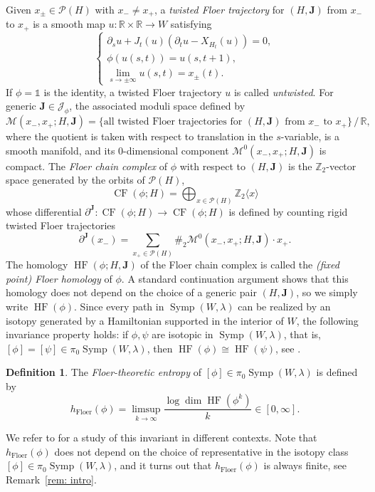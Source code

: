 \documentclass[12pt]{article}
\theoremstyle{theorem}
\theoremstyle{definition}
\newtheorem{definition}[theorem]{Definition}
\theoremstyle{remark}
\numberwithin{equation}{section}
\newcommand{\p}{\partial}
\newcommand{\R}{{\mathbb{R}}}
\newcommand{\Z}{{\mathbb{Z}}}
\DeclareMathOperator{\floer}{Floer}
\DeclareMathOperator{\Symp}{Symp}
\DeclareMathOperator{\HF}{HF}
\DeclareMathOperator{\CF}{CF}
\begin{document}
Given $x_\pm \in \mathcal{P}(H)$ with $x_-\ne x_+$,
a \emph{twisted Floer trajectory} for $(H,{\bm J})$ from $x_-$ to $x_+$ is a smooth map $u\colon \R\times \R \to W$ satisfying
$$
\begin{cases}
\p_s u + J_t(u)(\p_t u - X_{H_t}(u))=0, \\
\phi(u(s,t))=u(s,t+1), \\
\displaystyle \lim_{s\to \pm \infty}u(s,t)=x_\pm(t).
\end{cases}
$$
If $\phi=\mathds{1}$ is the identity, a twisted Floer trajectory $u$ is called \emph{untwisted}.
For generic ${\bm J}\in \mathcal{J}_\phi$, the associated moduli space defined by
$$
\mathcal{M}(x_-,x_+;H,{\bm J})=\big\{ \text{all twisted Floer trajectories for $(H,{\bm J})$ from $x_-$ to $x_+$}\big\}\, \big/\, \R,
$$
where the quotient is taken with respect to translation in the $s$-variable, is a smooth manifold, and its 0-dimensional component $\mathcal{M}^0(x_-,x_+;H,{\bm J})$ is compact.
The \emph{Floer chain complex} of $\phi$ with respect to $(H,{\bm J})$ is the $\Z_2$-vector space generated by the orbits of $\mathcal{P}(H)$,
$$
\CF(\phi;H)=\bigoplus_{x\in \mathcal{P}(H)}\Z_2\langle x \rangle
$$
whose differential $\p^{\bm J}\colon \CF(\phi;H)\to \CF(\phi;H)$ is defined by counting rigid twisted Floer trajectories
$$
\p^{\bm J}(x_-)=\sum_{x_+\in \mathcal{P}(H)} \#_2\mathcal{M}^0(x_-,x_+;H,{\bm J})\cdot x_+.
$$
The homology $\HF(\phi;H,{\bm J})$ of the Floer chain complex is called the \emph{(fixed point) Floer homology} of $\phi$.
A standard continuation argument shows that this homology does not depend on the choice of a  generic pair $(H,{\bm J})$, so we simply write $\HF(\phi)$.
Since every path in $\Symp(W,\lambda)$ can be realized by an isotopy generated by a Hamiltonian supported in the interior of $W$, the following invariance property holds: if $\phi,\psi$ are isotopic in $\Symp(W,\lambda)$, that is, $[\phi]=[\psi]\in\pi_0\Symp(W,\lambda)$, then $\HF(\phi)\cong \HF(\psi)$, see \cite[Theorem~2.34]{Ul17}.
\begin{definition}\label{def: floer_entropy}
	The \emph{Floer-theoretic entropy} of $[\phi]\in \pi_0\Symp(W,\lambda)$ is defined by
	$$
	h_{\floer}(\phi)=\limsup_{k\to \infty}\frac{\log \dim \HF(\phi^k)}{k}\in [0,\infty].
	$$
\end{definition}
We refer to \cite{Sm12, Fe12} for a study of this invariant in different contexts.
Note that $h_{\floer}(\phi)$ does not depend on the choice of representative in the isotopy class $[\phi]\in \pi_0\Symp(W,\lambda)$, and it turns out that $h_{\floer}(\phi)$ is always finite, see Remark~\ref{rem: intro}.
\end{document}
